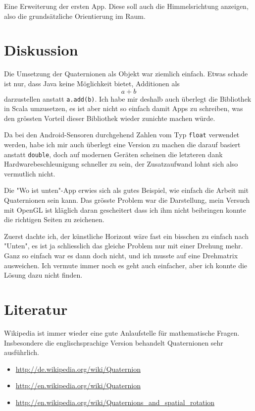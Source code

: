\documentclass[12pt]{article}
\begin{document}
  Eine Erweiterung der ersten App. Diese soll auch die Himmelsrichtung anzeigen, also die grundsätzliche Orientierung im Raum.


  \section{Diskussion}

  Die Umsetzung der Quaternionen als Objekt war ziemlich einfach. Etwas schade ist nur, dass Java keine Möglichkeit bietet, Additionen als $$a + b$$ darzustellen anstatt \texttt{a.add(b)}. Ich habe mir deshalb auch überlegt die Bibliothek in Scala umzusetzen, es ist aber nicht so einfach damit Apps zu schreiben, was den grössten Vorteil dieser Bibliothek wieder zunichte machen würde.

  Da bei den Android-Sensoren durchgehend Zahlen vom Typ \texttt{float} verwendet werden, habe ich mir auch überlegt eine Version zu machen die darauf basiert anstatt \texttt{double}, doch auf modernen Geräten scheinen die letzteren dank Hardwarebeschleunigung schneller zu sein, der Zusatzaufwand lohnt sich also vermutlich nicht.

  Die "Wo ist unten"-App erwies sich als gutes Beispiel, wie einfach die Arbeit mit Quaternionen sein kann. Das grösste Problem war die Darstellung, mein Versuch mit OpenGL ist kläglich daran gescheitert dass ich ihm nicht beibringen konnte die richtigen Seiten zu zeichenen.

  Zuerst dachte ich, der künstliche Horizont wäre fast ein bisschen zu einfach nach "Unten", es ist ja schliesslich das gleiche Problem nur mit einer Drehung mehr. Ganz so einfach war es dann doch nicht, und ich musste auf eine Drehmatrix ausweichen. Ich vermute immer noch es geht auch einfacher, aber ich konnte die Lösung dazu nicht finden.


  \section{Literatur}

  Wikipedia ist immer wieder eine gute Anlaufstelle für mathematische Fragen. Insbesondere die englischsprachige Version behandelt Quaternionen sehr ausführlich.

  \begin{itemize}
    \item \url{http://de.wikipedia.org/wiki/Quaternion}
    \item \url{http://en.wikipedia.org/wiki/Quaternion}
    \item \url{http://en.wikipedia.org/wiki/Quaternions_and_spatial_rotation}
  \end{itemize}
\end{document}
